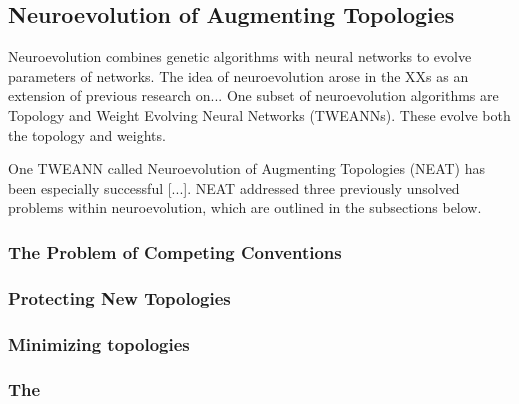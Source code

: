 \subsection{Neuroevolution of Augmenting Topologies}

Neuroevolution combines genetic algorithms with neural networks to evolve parameters of networks. The idea of 
neuroevolution arose in the XXs as an extension of previous research on...
One subset of neuroevolution algorithms are Topology and Weight Evolving Neural Networks (TWEANNs). These
evolve both the topology and weights.

One TWEANN called Neuroevolution of Augmenting Topologies (NEAT) has been especially successful [...].
NEAT addressed three previously unsolved problems within neuroevolution, which are outlined in the subsections below.


\subsubsection{The Problem of Competing Conventions}
\subsubsection{Protecting New Topologies}
\subsubsection{Minimizing topologies}

\subsubsection{The }